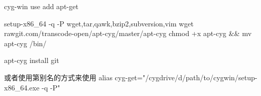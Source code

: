 cyg-win use add apt-get

setup-x86_64 -q -P wget,tar,qawk,bzip2,subversion,vim
wget rawgit.com/transcode-open/apt-cyg/master/apt-cyg
chmod +x apt-cyg && mv apt-cyg /bin/

apt-cyg install git

或者使用第别名的方式来使用
alias cyg-get="/cygdrive/d/path/to/cygwin/setup-x86_64.exe -q -P"
